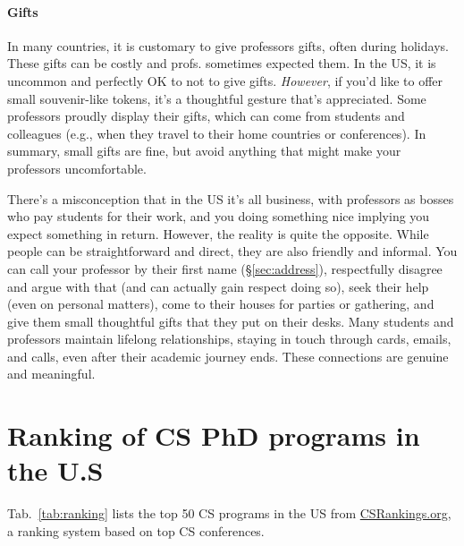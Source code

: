\documentclass[11pt]{article}
\begin{document}
\paragraph{Gifts} In many countries, it is customary to give professors gifts, often during holidays.  These gifts can be costly and profs. sometimes expected them. In the US, it is uncommon and perfectly OK to not to give gifts. \emph{However}, if you'd like to offer small souvenir-like tokens, it's a thoughtful gesture that's appreciated. Some professors proudly display their gifts, which can come from students and colleagues (e.g., when they travel to their home countries or conferences). In summary, small gifts are fine, but avoid anything that might make your professors uncomfortable.


There's a misconception that in the US it's all business, with professors as bosses who pay students for their work, and you doing something nice implying you expect something in return. However, the reality is quite the opposite. While people can be straightforward and direct, they are also friendly and informal. You can call your professor by their first name (\S\ref{sec:address}), respectfully disagree and argue with that (and can actually gain respect doing so), seek their help (even on personal matters), come to their houses for parties or gathering, and give them small thoughtful gifts that they put on their desks.  Many students and professors maintain lifelong relationships, staying in touch through cards, emails, and calls, even after their academic journey ends. These connections are genuine and meaningful.


\section{Ranking of CS PhD programs in the U.S}\label{sec:ranking}
  Tab.~\ref{tab:ranking} lists the top 50 CS programs in the US from \href{https://www.csrankings.org}{CSRankings.org}, a ranking system  based on top CS conferences.
  
\end{document}
